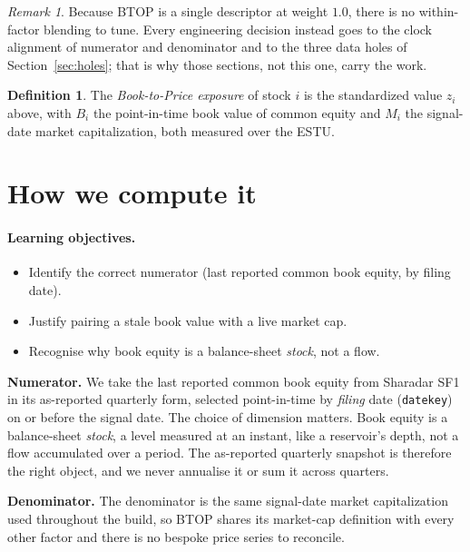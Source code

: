 \documentclass[11pt]{article}
\theoremstyle{definition}
\newtheorem{definition}{Definition}[section]
\theoremstyle{plain}
\theoremstyle{remark}
\newtheorem*{remark}{Remark}
\begin{document}
\begin{remark}
Because BTOP is a single descriptor at weight $1.0$, there is no within-factor blending to tune. Every engineering decision instead goes to the clock alignment of numerator and denominator and to the three data holes of Section~\ref{sec:holes}; that is why those sections, not this one, carry the work.
\end{remark}

\begin{definition}
The \emph{Book-to-Price exposure} of stock $i$ is the standardized value $z_i$ above, with $B_i$ the point-in-time book value of common equity and $M_i$ the signal-date market capitalization, both measured over the ESTU.
\end{definition}

\section{How we compute it}\label{sec:compute}

\paragraph{Learning objectives.}
\begin{itemize}[leftmargin=1.4em,nosep]
  \item Identify the correct numerator (last reported common book equity, by filing date).
  \item Justify pairing a stale book value with a live market cap.
  \item Recognise why book equity is a balance-sheet \emph{stock}, not a flow.
\end{itemize}

\textbf{Numerator.} We take the last reported common book equity from Sharadar SF1 in its as-reported quarterly form, selected point-in-time by \emph{filing} date (\texttt{datekey}) on or before the signal date. The choice of dimension matters. Book equity is a balance-sheet \emph{stock}, a level measured at an instant, like a reservoir's depth, not a flow accumulated over a period. The as-reported quarterly snapshot is therefore the right object, and we never annualise it or sum it across quarters.

\textbf{Denominator.} The denominator is the same signal-date market capitalization used throughout the build, so BTOP shares its market-cap definition with every other factor and there is no bespoke price series to reconcile.
\end{document}
